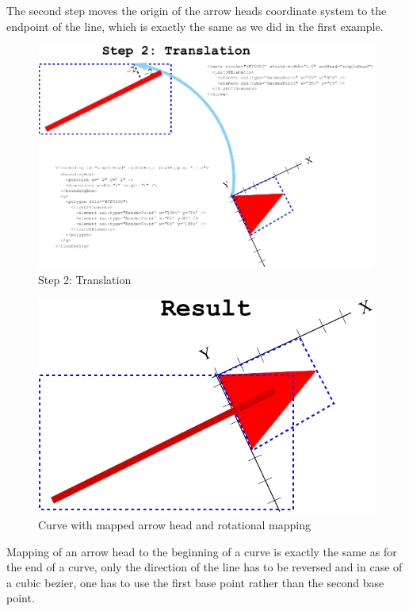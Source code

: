 The second step moves the origin of the arrow heads coordinate system to the endpoint of the line, which is exactly the same as we did in the first example.

\begin{figure}[!ht]
\begin{center}
\includegraphics{figures/ArrowHeadMapping4.pdf}
\end{center}
\caption{Step 2: Translation}
\label{ArrowHeadMapping4}
\end{figure}

\begin{figure}[!ht]
\begin{center}
\includegraphics{figures/ArrowHeadMapping5.pdf}
\end{center}
\caption{Curve with mapped arrow head and rotational mapping}
\label{ArrowHeadMapping5}
\end{figure}

Mapping of an arrow head to the beginning of a curve is exactly the same as for the end of a curve, only the
direction of the line has to be reversed and in case of a cubic bezier, one has to use the first base point rather than the second base point. 

